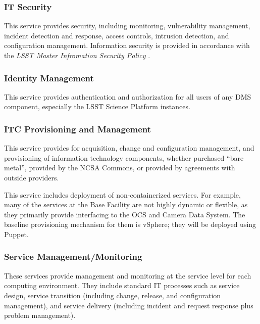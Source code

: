 \documentclass[DM,toc,lsstdraft]{lsstdoc}
\begin{document}
\subsubsection{IT Security}\label{it-security}

This service provides security, including monitoring, vulnerability management, incident detection and response, access controls, intrusion detection, and configuration management.
Information security is provided in accordance with the \textit{LSST Master Infromation Security Policy} .

\subsubsection{Identity Management}\label{identity-management}

This service provides authentication and authorization for all users of
any DMS component, especially the LSST Science Platform instances.

\subsubsection{ITC Provisioning and Management}\label{itc-provisioning-management}

This service provides for acquisition, change and configuration management, and provisioning of information technology components, whether purchased ``bare metal'', provided by the NCSA Commons, or provided by agreements with outside providers.

This service includes deployment of non-containerized services.
For example, many of the services at the Base Facility are not highly dynamic or flexible, as they primarily provide interfacing to the OCS and Camera Data System.
The baseline provisioning mechanism for them is vSphere; they will be deployed using Puppet.

\subsubsection{Service Management/Monitoring}\label{service-management-monitoring}

These services provide management and monitoring at the service level for each computing environment.
They include standard IT processes such as service design, service transition (including change, release, and configuration management), and service delivery (including incident and request response plus problem management).
\end{document}
